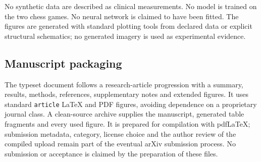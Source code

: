 \documentclass[10pt,a4paper]{article}
\begin{document}
No synthetic data are described as clinical measurements. No model is trained on the two chess games. No neural network is claimed to have been fitted. The figures are generated with standard plotting tools from declared data or explicit structural schematics; no generated imagery is used as experimental evidence.

\subsection*{Manuscript packaging}
The typeset document follows a research-article progression with a summary, results, methods, references, supplementary notes and extended figures. It uses standard \texttt{article} LaTeX and PDF figures, avoiding dependence on a proprietary journal class. A clean-source archive supplies the manuscript, generated table fragments and every used figure. It is prepared for compilation with pdfLaTeX; submission metadata, category, license choice and the author review of the compiled upload remain part of the eventual arXiv submission process. No submission or acceptance is claimed by the preparation of these files.
\end{document}
